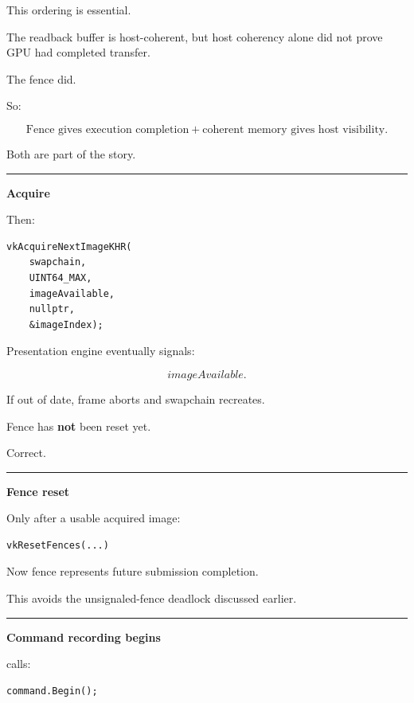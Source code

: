 This ordering is essential.

The readback buffer is host-coherent, but host coherency alone did not prove GPU had completed transfer.

The fence did.

So:

\[
\boxed{
\text{Fence gives execution completion}
+
\text{coherent memory gives host visibility}.
}
\]

Both are part of the story.

\begin{center}\rule{0.5\linewidth}{0.5pt}\end{center}

\textbf{Acquire}

Then:

\begin{verbatim}
vkAcquireNextImageKHR(
    swapchain,
    UINT64_MAX,
    imageAvailable,
    nullptr,
    &imageIndex);
\end{verbatim}

Presentation engine eventually signals:

\[
imageAvailable.
\]

If out of date, frame aborts and swapchain recreates.

Fence has \textbf{not} been reset yet.

Correct.

\begin{center}\rule{0.5\linewidth}{0.5pt}\end{center}

\textbf{Fence reset}

Only after a usable acquired image:

\begin{verbatim}
vkResetFences(...)
\end{verbatim}

Now fence represents future submission completion.

This avoids the unsignaled-fence deadlock discussed earlier.

\begin{center}\rule{0.5\linewidth}{0.5pt}\end{center}

\textbf{Command recording begins}

 calls:

\begin{verbatim}
command.Begin();
\end{verbatim}


